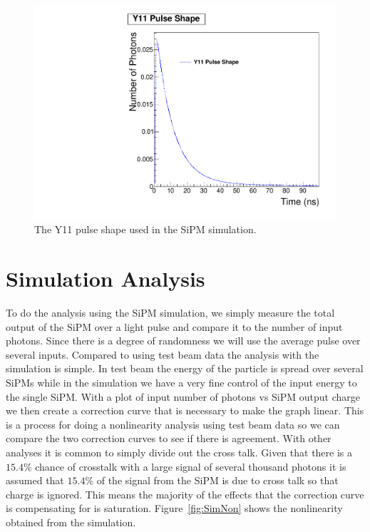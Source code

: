\begin{figure}
\centering
\includegraphics[width=0.8\linewidth]{Figures/Y11.pdf}
\caption{The Y11 pulse shape used in the SiPM simulation.}
\label{fig:Y11}
\end{figure}

\section{Simulation Analysis}

To do the analysis using the SiPM simulation, we simply measure the total output of the SiPM over a light pulse and compare it to the number of input photons. Since there is a degree of randomness we will use the average pulse over several inputs. Compared to using test beam data the analysis with the simulation is simple. In test beam the energy of the particle is spread over several SiPMs while in the simulation we have a very fine control of the input energy to the single SiPM. With a plot of input number of photons vs SiPM output charge we then create a correction curve that is necessary to make the graph linear. This is a process for doing a nonlinearity analysis using test beam data so we can compare the two correction curves to see if there is agreement. With other analyses it is common to simply divide out the cross talk. Given that there is a $15.4\%$ chance of crosstalk with a large signal of several thousand photons it is assumed that $15.4\%$ of the signal from the SiPM is due to cross talk so that charge is ignored. This means the majority of the effects that the correction curve is compensating for is saturation. Figure~\ref{fig:SimNon} shows the nonlinearity obtained from the simulation.


